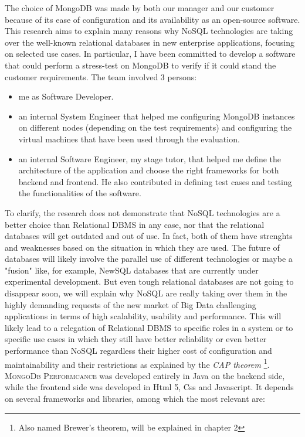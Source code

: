 The choice of MongoDB was made by both our manager and our customer because of its ease of configuration and its availability as 
an open-source software.
This research aims to explain many reasons why NoSQL technologies are taking over the well-known relational databases in new enterprise applications, focusing on selected use cases.
In particular, I have been committed to develop a software that could perform a stress-test on MongoDB to verify if it could stand the customer requirements.
The team involved 3 persons:
\begin{itemize}
  \item me as Software Developer.
  \item an internal System Engineer that helped me configuring MongoDB instances on different nodes (depending on the test requirements) and configuring the virtual machines that have been used through the evaluation.
  \item an internal Software Engineer, my stage tutor, that helped me define the architecture of the application and choose the right frameworks for both backend and frontend. He also contributed in defining test cases and testing the functionalities of the software.
\end{itemize}
To clarify, the research does not demonstrate that NoSQL technologies are a better choice than Relational DBMS in any case, nor that the relational databases will get outdated and out of use.
In fact, both of them have strenghts and weaknesses based on the situation in which they are used.
The future of databases will likely involve the parallel use of different technologies or maybe a "fusion" like, for example, NewSQL databases that are currently under experimental development.
But even tough relational databases are not going to disappear soon, we will explain why NoSQL are really taking over them in the highly demanding requests of the new market of Big Data challenging applications in terms of high scalability, usability and performance.
This will likely lead to a relegation of Relational DBMS to specific roles in a system or to specific use cases in which they still have better reliability or even better performance than NoSQL regardless their higher cost of configuration and maintainability and their restrictions as explained by the \textit{CAP theorem} \footnote{Also named Brewer's theorem, will be explained in chapter 2}.
\textsc{MongoDb Performcance} was developed entirely in Java on the backend side, while the frontend side was developed in Html 5, Css and Javascript.
It depends on several frameworks and libraries, among which the most relevant are:
